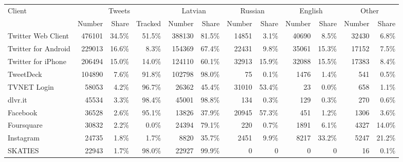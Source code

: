 \begin{tabular}{lrrrrrrrrrrr} 
\toprule
\multirow{2}{*}{Client} & \multicolumn{3}{c}{Tweets} & \multicolumn{2}{c}{Latvian} & \multicolumn{2}{c}{Russian} & \multicolumn{2}{c}{English} & \multicolumn{2}{c}{Other} \\
\cmidrule(r){2-4} \cmidrule(r){5-6} \cmidrule(r){7-8} \cmidrule(r){9-10} \cmidrule(r){11-12}
{} &  Number & Share & Tracked & Number & Share & Number & Share & Number & Share & Number & Share \\
\midrule
Twitter Web Client  &      476101 &       34.5\% &                51.5\% &            388130 &             81.5\% &             14851 &              3.1\% &             40690 &              8.5\% &            32430 &             6.8\% \\
Twitter for Android &      229013 &       16.6\% &                 8.3\% &            154369 &             67.4\% &             22431 &              9.8\% &             35061 &             15.3\% &            17152 &             7.5\% \\
Twitter for iPhone  &      206494 &       15.0\% &                14.0\% &            124110 &             60.1\% &             32913 &             15.9\% &             32088 &             15.5\% &            17383 &             8.4\% \\
TweetDeck           &      104890 &        7.6\% &                91.8\% &            102798 &             98.0\% &                75 &              0.1\% &              1476 &              1.4\% &              541 &             0.5\% \\
TVNET Login         &       58053 &        4.2\% &                96.7\% &             26362 &             45.4\% &             31010 &             53.4\% &                23 &              0.0\% &              658 &             1.1\% \\
dlvr.it             &       45534 &        3.3\% &                98.4\% &             45001 &             98.8\% &               134 &              0.3\% &               129 &              0.3\% &              270 &             0.6\% \\
Facebook            &       36528 &        2.6\% &                95.1\% &             13826 &             37.9\% &             20945 &             57.3\% &               451 &              1.2\% &             1306 &             3.6\% \\
Foursquare          &       30832 &        2.2\% &                 0.0\% &             24394 &             79.1\% &               220 &              0.7\% &              1891 &              6.1\% &             4327 &            14.0\% \\
Instagram           &       24735 &        1.8\% &                 1.7\% &              8820 &             35.7\% &              2451 &              9.9\% &              8217 &             33.2\% &             5247 &            21.2\% \\
SKATIES             &       22943 &        1.7\% &                98.0\% &             22927 &             99.9\% &                 0 &                 0 &                 0 &                 0 &               16 &             0.1\% \\
\bottomrule
\end{tabular}

